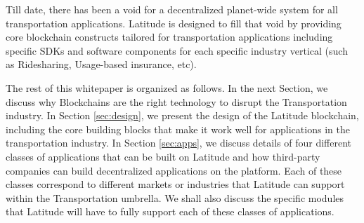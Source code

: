 Till date, there has been a void for a decentralized planet-wide system for all transportation applications. Latitude is
designed to fill that void by providing core blockchain constructs tailored for transportation applications including
specific SDKs and software components for each specific industry vertical (such as Ridesharing, Usage-based insurance,
etc).

The rest of this whitepaper is organized as follows. In the next Section, we discuss why Blockchains are the right
technology to disrupt the Transportation industry. In Section \ref{sec:design}, we present the design of the Latitude
blockchain, including the core building blocks that make it work well for applications in the transportation industry.
In Section \ref{sec:apps}, we discuss details of four different classes of applications that can be built on Latitude
and how third-party companies can build decentralized applications on the platform. Each of these classes correspond to
different markets or industries that Latitude can support within the Transportation umbrella. We shall also discuss the
specific modules that Latitude will have to fully support each of these classes of applications.


%

